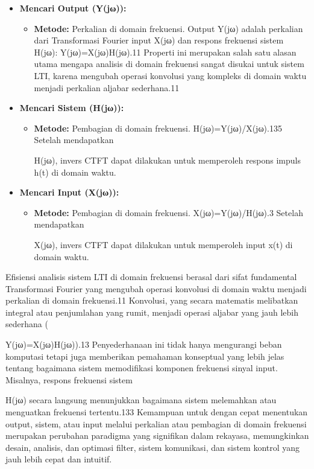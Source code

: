 \documentclass[
  letterpaper,
  DIV=11,
  numbers=noendperiod]{scrreprt}
\providecommand{\tightlist}{%
  \setlength{\itemsep}{0pt}\setlength{\parskip}{0pt}}\usepackage{longtable,booktabs,array}
\begin{document}
\begin{itemize}
\item
  \textbf{Mencari Output (Y(jω)):}

  \begin{itemize}
  \tightlist
  \item
    \textbf{Metode:} Perkalian di domain frekuensi. Output Y(jω) adalah
    perkalian dari Transformasi Fourier input X(jω) dan respons
    frekuensi sistem H(jω): Y(jω)=X(jω)H(jω).11 Properti ini merupakan
    salah satu alasan utama mengapa analisis di domain frekuensi sangat
    disukai untuk sistem LTI, karena mengubah operasi konvolusi yang
    kompleks di domain waktu menjadi perkalian aljabar sederhana.11
  \end{itemize}
\item
  \textbf{Mencari Sistem (H(jω)):}

  \begin{itemize}
  \item
    \textbf{Metode:} Pembagian di domain frekuensi.
    H(jω)=Y(jω)/X(jω).135 Setelah mendapatkan

    H(jω), invers CTFT dapat dilakukan untuk memperoleh respons impuls
    h(t) di domain waktu.
  \end{itemize}
\item
  \textbf{Mencari Input (X(jω)):}

  \begin{itemize}
  \item
    \textbf{Metode:} Pembagian di domain frekuensi. X(jω)=Y(jω)/H(jω).3
    Setelah mendapatkan

    X(jω), invers CTFT dapat dilakukan untuk memperoleh input x(t) di
    domain waktu.
  \end{itemize}
\end{itemize}

Efisiensi analisis sistem LTI di domain frekuensi berasal dari sifat
fundamental Transformasi Fourier yang mengubah operasi konvolusi di
domain waktu menjadi perkalian di domain frekuensi.11 Konvolusi, yang
secara matematis melibatkan integral atau penjumlahan yang rumit,
menjadi operasi aljabar yang jauh lebih sederhana (

Y(jω)=X(jω)H(jω)).13 Penyederhanaan ini tidak hanya mengurangi beban
komputasi tetapi juga memberikan pemahaman konseptual yang lebih jelas
tentang bagaimana sistem memodifikasi komponen frekuensi sinyal input.
Misalnya, respons frekuensi sistem

H(jω) secara langsung menunjukkan bagaimana sistem melemahkan atau
menguatkan frekuensi tertentu.133 Kemampuan untuk dengan cepat
menentukan output, sistem, atau input melalui perkalian atau pembagian
di domain frekuensi merupakan perubahan paradigma yang signifikan dalam
rekayasa, memungkinkan desain, analisis, dan optimasi filter, sistem
komunikasi, dan sistem kontrol yang jauh lebih cepat dan intuitif.
\end{document}
